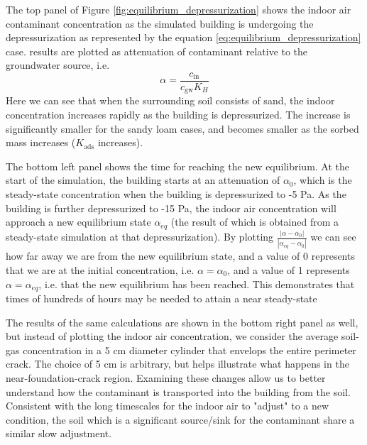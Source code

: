 The top panel of Figure \ref{fig:equilibrium_depressurization} shows the indoor air contaminant concentration as the simulated building is undergoing the depressurization as represented by the equation \eqref{eq:equilibrium_depressurization} case.
results are plotted as attenuation of contaminant relative to the groundwater source, i.e.
\begin{equation}
  \alpha = \frac{c_\mathrm{in}}{c_\mathrm{gw} K_H}
\end{equation}
Here we can see that when the surrounding soil consists of sand, the indoor concentration increases rapidly as the building is depressurized.
The increase is significantly smaller for the sandy loam cases, and becomes smaller as the sorbed mass increases ($K_\mathrm{ads}$ increases).\par

The bottom left panel shows the time for reaching the new equilibrium.
At the start of the simulation, the building starts at an attenuation of $\alpha_0$, which is the steady-state concentration when the building is depressurized to -5 Pa.
As the building is further depressurized to -15 Pa, the indoor air concentration will approach a new equilibrium state $\alpha_{eq}$ (the result of which is obtained from a steady-state simulation at that depressurization).
By plotting $\frac{|\alpha-\alpha_0|}{|\alpha_{eq}-\alpha_0|}$ we can see how far away we are from the new equilibrium state, and a value of 0 represents that we are at the initial concentration, i.e. $\alpha = \alpha_0$, and a value of 1 represents $\alpha = \alpha_{eq}$, i.e. that the new equilibrium has been reached.
This demonstrates that times of hundreds of hours may be needed to attain a near steady-state\par

The results of the same calculations are shown in the bottom right panel as well, but instead of plotting the indoor air concentration, we consider the average soil-gas concentration in a 5 cm diameter cylinder that envelops the entire perimeter crack.
The choice of 5 cm is arbitrary, but helps illustrate what happens in the near-foundation-crack region.
Examining these changes allow us to better understand how the contaminant is transported into the building from the soil.
Consistent with the long timescales for the indoor air to "adjust" to a new condition, the soil which is a significant source/sink for the contaminant share a similar slow adjustment.\par

